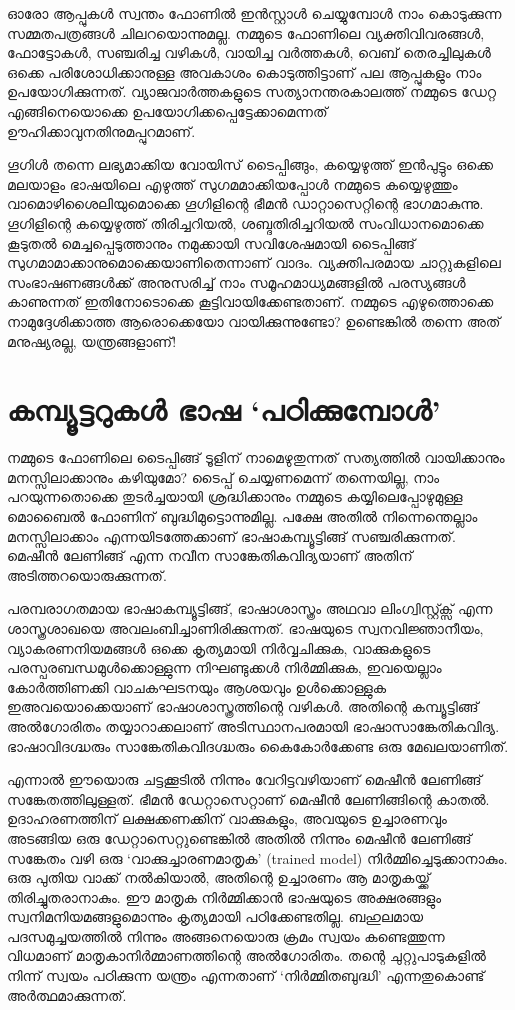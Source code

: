 \documentclass[12pt,twoside,a4paper]{article}
\begin{document}
ഓരോ ആപ്പുകൾ സ്വന്തം ഫോണിൽ ഇൻസ്റ്റാൾ ചെയ്യുമ്പോൾ നാം കൊടുക്കുന്ന സമ്മതപത്രങ്ങൾ ചിലറയൊന്നുമല്ല. നമ്മുടെ ഫോണിലെ വ്യക്തിവിവരങ്ങൾ, ഫോട്ടോകൾ, സഞ്ചരിച്ച വഴികൾ, വായിച്ച വർത്തകൾ, വെബ് തെരച്ചിലുകൾ ഒക്കെ പരിശോധിക്കാനുള്ള അവകാശം കൊടുത്തിട്ടാണ് പല ആപ്പുകളും നാം ഉപയോഗിക്കുന്നത്.  വ്യാജവാർത്തകളുടെ സത്യാനന്തരകാലത്ത്  നമ്മുടെ ഡേറ്റ എങ്ങിനെയൊക്കെ ഉപയോഗിക്കപ്പെട്ടേക്കാമെന്നത് ഊഹിക്കാവുനതിനുമപ്പുറമാണ്. 

ഗൂഗിൾ തന്നെ ലഭ്യമാക്കിയ വോയിസ് ടൈപ്പിങ്ങും, കയ്യെഴുത്ത് ഇൻപുട്ടും ഒക്കെ മലയാളം ഭാഷയിലെ എഴുത്ത് സുഗമമാക്കിയപ്പോൾ നമ്മുടെ കയ്യെഴുത്തും വാമൊഴിശൈലിയുമൊക്കെ ഗൂഗിളിന്റെ ഭീമൻ ഡാറ്റാസെറ്റിന്റെ ഭാഗമാകുന്നു. ഗൂഗിളിന്റെ കയ്യെഴുത്ത് തിരിച്ചറിയൽ, ശബ്ദതിരിച്ചറിയൽ സംവിധാനമൊക്കെ കൂടുതൽ മെച്ചപ്പെടുത്താനും നമുക്കായി സവിശേഷമായി ടൈപ്പിങ്ങ് സുഗമാമാക്കാനുമൊക്കെയാണിതെന്നാണ് വാദം. വ്യക്തിപരമായ ചാറ്റുകളിലെ സംഭാഷണങ്ങൾക്ക് അനുസരിച്ച് നാം സമൂഹമാധ്യമങ്ങളിൽ പരസ്യങ്ങൾ  കാണുന്നത് ഇതിനോടൊക്കെ കൂട്ടിവായിക്കേണ്ടതാണ്. നമ്മുടെ എഴുത്തൊക്കെ നാമുദ്ദേശിക്കാത്ത ആരൊക്കെയോ വായിക്കുന്നുണ്ടോ? ഉണ്ടെങ്കിൽ തന്നെ അത് മനുഷ്യരല്ല, യന്ത്രങ്ങളാണ്!

\section{കമ്പ്യൂട്ടറുകൾ ഭാഷ `പഠിക്കുമ്പോൾ'}

നമ്മുടെ ഫോണിലെ ടൈപ്പിങ്ങ് ടൂളിന് നാമെഴുതുന്നത്  സത്യത്തിൽ വായിക്കാനും മനസ്സിലാക്കാനും കഴിയുമോ?  ടൈപ്പ് ചെയ്യണമെന്ന് തന്നെയില്ല, നാം പറയുന്നതൊക്കെ തുടർച്ചയായി ശ്രദ്ധിക്കാനും നമ്മുടെ കയ്യിലെപ്പോഴുമുള്ള മൊബൈൽ ഫോണിന് ബുദ്ധിമുട്ടൊന്നുമില്ല. പക്ഷേ അതിൽ നിന്നെന്തെല്ലാം മനസ്സിലാക്കാം എന്നയിടത്തേക്കാണ് ഭാഷാകമ്പ്യൂട്ടിങ്ങ് സഞ്ചരിക്കുന്നത്. മെഷീൻ ലേണിങ്ങ് എന്ന നവീന സാങ്കേതികവിദ്യയാണ് അതിന് അടിത്തറയൊരുക്കുന്നത്.

പരമ്പരാഗതമായ ഭാഷാകമ്പ്യൂട്ടിങ്ങ്, ഭാഷാശാസ്ത്രം അഥവാ ലിംഗ്വിസ്റ്റ്ക്സ് എന്ന ശാസ്ത്രശാഖയെ അവലംബിച്ചാണിരിക്കുന്നത്. ഭാഷയുടെ സ്വനവിജ്ഞാനീയം, വ്യാകരണനിയമങ്ങൾ ഒക്കെ കൃത്യമായി നിർവ്വചിക്കുക, വാക്കുകളുടെ പരസ്പരബന്ധമുൾക്കൊള്ളുന്ന നിഘണ്ടുക്കൾ നിർമ്മിക്കുക, ഇവയെല്ലാം കോർത്തിണക്കി വാചകഘടനയും ആശയവും ഉൾക്കൊള്ളുക ഇഅവയൊക്കെയാണ് ഭാഷാശാസ്ത്രത്തിന്റെ വഴികൾ. അതിന്റെ കമ്പ്യൂട്ടിങ്ങ് അൽഗോരിതം തയ്യാറാക്കലാണ് അടിസ്ഥാനപരമായി ഭാഷാസാങ്കേതികവിദ്യ. ഭാഷാവിദഗ്ദ്ധരും സാങ്കേതികവിദഗ്ദ്ധരും കൈകോർക്കേണ്ട ഒരു മേഖലയാണിത്.

എന്നാൽ ഈയൊരു ചട്ടക്കൂടിൽ നിന്നും വേറിട്ടവഴിയാണ് മെഷീൻ ലേണിങ്ങ് സങ്കേതത്തിലുള്ളത്. ഭീമൻ ഡേറ്റാസെറ്റാണ് മെഷീൻ ലേണിങ്ങിന്റെ കാതൽ. ഉദാഹരണത്തിന് ലക്ഷക്കണക്കിന് വാക്കുകളും, അവയുടെ ഉച്ചാരണവും അടങ്ങിയ ഒരു ഡേറ്റാസെറ്റുണ്ടെങ്കിൽ അതിൽ നിന്നും മെഷീൻ ലേണിങ്ങ് സങ്കേതം വഴി ഒരു `വാക്കുച്ചാരണമാതൃക' (trained model) നിർമ്മിച്ചെടുക്കാനാകും. ഒരു പുതിയ വാക്ക് നൽകിയാൽ, അതിന്റെ ഉച്ചാരണം ആ മാതൃകയ്ക്ക് തിരിച്ചുതരാനാകും. ഈ മാതൃക നിർമ്മിക്കാൻ ഭാഷയുടെ അക്ഷരങ്ങളും സ്വനിമനിയമങ്ങളുമൊന്നും കൃത്യമായി പഠിക്കേണ്ടതില്ല. ബഹുലമായ പദസമുച്ചയത്തിൽ നിന്നും അങ്ങനെയൊരു ക്രമം സ്വയം കണ്ടെത്തുന്ന വിധമാണ് മാതൃകാനിർമ്മാണത്തിന്റെ അൽഗോരിതം. തന്റെ ചുറ്റുപാടുകളിൽ നിന്ന് സ്വയം പഠിക്കുന്ന യന്ത്രം എന്നതാണ് `നിർമ്മിതബുദ്ധി' എന്നതുകൊണ്ട് അർത്ഥമാക്കുന്നത്.
\end{document}
